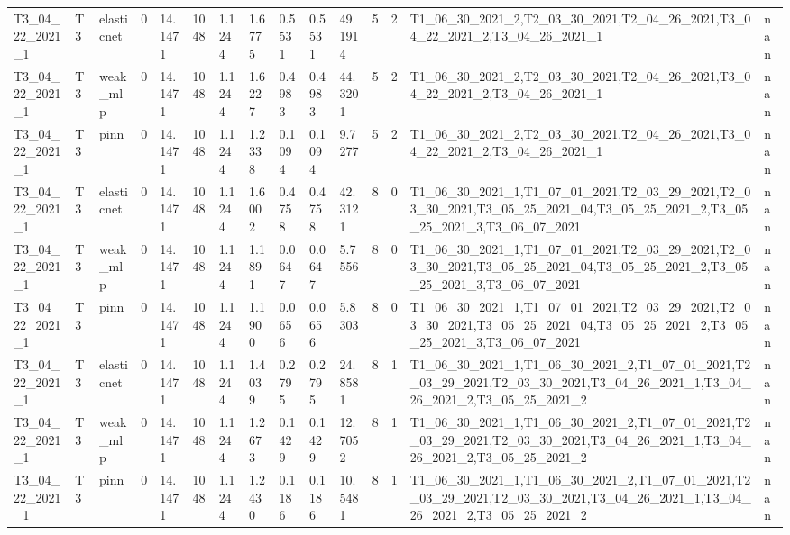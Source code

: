\begin{table}[t]
\begin{tabular}{lllllllllllllll}
T3\_04\_22\_2021\_1 & T3 & elasticnet & 0 & 14.1471 & 1048 & 1.1244 & 1.6775 & 0.5531 & 0.5531 & 49.1914 & 5 & 2 & T1\_06\_30\_2021\_2,T2\_03\_30\_2021,T2\_04\_26\_2021,T3\_04\_22\_2021\_2,T3\_04\_26\_2021\_1 & nan \\
T3\_04\_22\_2021\_1 & T3 & weak\_mlp & 0 & 14.1471 & 1048 & 1.1244 & 1.6227 & 0.4983 & 0.4983 & 44.3201 & 5 & 2 & T1\_06\_30\_2021\_2,T2\_03\_30\_2021,T2\_04\_26\_2021,T3\_04\_22\_2021\_2,T3\_04\_26\_2021\_1 & nan \\
T3\_04\_22\_2021\_1 & T3 & pinn & 0 & 14.1471 & 1048 & 1.1244 & 1.2338 & 0.1094 & 0.1094 & 9.7277 & 5 & 2 & T1\_06\_30\_2021\_2,T2\_03\_30\_2021,T2\_04\_26\_2021,T3\_04\_22\_2021\_2,T3\_04\_26\_2021\_1 & nan \\
T3\_04\_22\_2021\_1 & T3 & elasticnet & 0 & 14.1471 & 1048 & 1.1244 & 1.6002 & 0.4758 & 0.4758 & 42.3121 & 8 & 0 & T1\_06\_30\_2021\_1,T1\_07\_01\_2021,T2\_03\_29\_2021,T2\_03\_30\_2021,T3\_05\_25\_2021\_04,T3\_05\_25\_2021\_2,T3\_05\_25\_2021\_3,T3\_06\_07\_2021 & nan \\
T3\_04\_22\_2021\_1 & T3 & weak\_mlp & 0 & 14.1471 & 1048 & 1.1244 & 1.1891 & 0.0647 & 0.0647 & 5.7556 & 8 & 0 & T1\_06\_30\_2021\_1,T1\_07\_01\_2021,T2\_03\_29\_2021,T2\_03\_30\_2021,T3\_05\_25\_2021\_04,T3\_05\_25\_2021\_2,T3\_05\_25\_2021\_3,T3\_06\_07\_2021 & nan \\
T3\_04\_22\_2021\_1 & T3 & pinn & 0 & 14.1471 & 1048 & 1.1244 & 1.1900 & 0.0656 & 0.0656 & 5.8303 & 8 & 0 & T1\_06\_30\_2021\_1,T1\_07\_01\_2021,T2\_03\_29\_2021,T2\_03\_30\_2021,T3\_05\_25\_2021\_04,T3\_05\_25\_2021\_2,T3\_05\_25\_2021\_3,T3\_06\_07\_2021 & nan \\
T3\_04\_22\_2021\_1 & T3 & elasticnet & 0 & 14.1471 & 1048 & 1.1244 & 1.4039 & 0.2795 & 0.2795 & 24.8581 & 8 & 1 & T1\_06\_30\_2021\_1,T1\_06\_30\_2021\_2,T1\_07\_01\_2021,T2\_03\_29\_2021,T2\_03\_30\_2021,T3\_04\_26\_2021\_1,T3\_04\_26\_2021\_2,T3\_05\_25\_2021\_2 & nan \\
T3\_04\_22\_2021\_1 & T3 & weak\_mlp & 0 & 14.1471 & 1048 & 1.1244 & 1.2673 & 0.1429 & 0.1429 & 12.7052 & 8 & 1 & T1\_06\_30\_2021\_1,T1\_06\_30\_2021\_2,T1\_07\_01\_2021,T2\_03\_29\_2021,T2\_03\_30\_2021,T3\_04\_26\_2021\_1,T3\_04\_26\_2021\_2,T3\_05\_25\_2021\_2 & nan \\
T3\_04\_22\_2021\_1 & T3 & pinn & 0 & 14.1471 & 1048 & 1.1244 & 1.2430 & 0.1186 & 0.1186 & 10.5481 & 8 & 1 & T1\_06\_30\_2021\_1,T1\_06\_30\_2021\_2,T1\_07\_01\_2021,T2\_03\_29\_2021,T2\_03\_30\_2021,T3\_04\_26\_2021\_1,T3\_04\_26\_2021\_2,T3\_05\_25\_2021\_2 & nan \\

\end{tabular}
\end{table}
